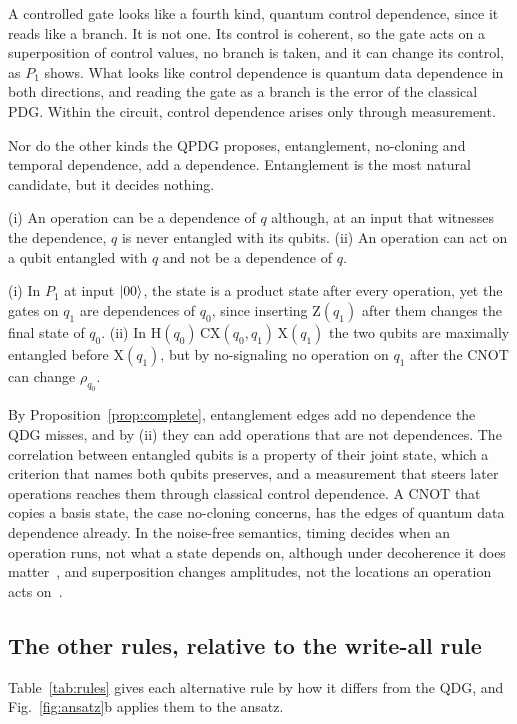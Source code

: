 A controlled gate looks like a fourth kind, quantum control dependence, since it reads like a branch. It is not
one. Its control is coherent, so the gate acts on a superposition of control values, no branch is taken, and it can
change its control, as $P_1$ shows. What looks like control dependence is quantum data dependence in both directions,
and reading the gate as a branch is the error of the classical PDG. Within the circuit, control dependence arises
only through measurement.

Nor do the other kinds the QPDG proposes, entanglement, no-cloning and temporal dependence, add a dependence. Entanglement is the most natural candidate, but it decides
nothing.

\begin{proposition}\label{prop:ent}
(i) An operation can be a dependence of $q$ although, at an input that witnesses the dependence, $q$ is never
entangled with its qubits. (ii) An operation can act on a qubit entangled with $q$ and not be a dependence of $q$.
\end{proposition}

\begin{IEEEproof}
(i) In $P_1$ at input $\lvert 00\rangle$, the state is a product state after every operation, yet the gates on $q_1$ are
dependences of $q_0$, since inserting $\mathrm{Z}(q_1)$ after them changes the final state of $q_0$. (ii) In
$\mathrm{H}(q_0)\,\mathrm{CX}(q_0, q_1)\,\mathrm{X}(q_1)$ the two qubits are maximally entangled before
$\mathrm{X}(q_1)$, but by no-signaling no operation on $q_1$ after the CNOT can change $\rho_{q_0}$.
\end{IEEEproof}

By Proposition~\ref{prop:complete}, entanglement edges add no dependence the QDG misses, and by (ii) they can add operations that are not dependences. The correlation between entangled qubits is a property of their
joint state, which a criterion that names both qubits preserves, and a measurement that steers later operations
reaches them through classical control dependence. A CNOT that copies a basis state, the case no-cloning concerns, has the edges of
quantum data dependence already. In the noise-free semantics, timing decides when an operation runs, not what a state
depends on, although under decoherence it does matter~\cite{smith2022timestitch}, and superposition changes amplitudes, not the locations an operation
acts on~\cite{nielsen2010quantum}.

\subsection{The other rules, relative to the write-all rule}\label{sec:rules}
Table~\ref{tab:rules} gives each alternative rule by how it differs from the QDG, and Fig.~\ref{fig:ansatz}b
applies them to the ansatz.

